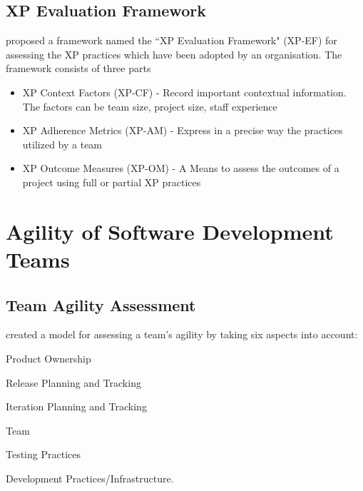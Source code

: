 
\subsection{XP Evaluation Framework} %
\citet{williams2004toward} proposed a framework named the ``XP Evaluation Framework" (XP-EF) for assessing the XP practices which have been adopted by an organisation. The framework consists of three parts
\begin{itemize}
	\item XP Context Factors (XP-CF) - Record important contextual information. The factors can be team size, project size, staff experience
	\item XP Adherence Metrics (XP-AM) - Express in a precise way the practices utilized by a team
	\item XP Outcome Measures (XP-OM) - A Means to assess the outcomes of a project using full or partial XP practices
\end{itemize}



\section{Agility of Software Development Teams}

\subsection{Team Agility Assessment} %
\citet{Leffingwell} created a model for assessing a team's agility by
 taking six aspects into account:
\begin{inparaenum} [a\upshape)]
\item Product Ownership
\item Release Planning and Tracking
\item Iteration Planning and Tracking
\item Team
\item Testing Practices
\item Development Practices/Infrastructure.
\end{inparaenum}

